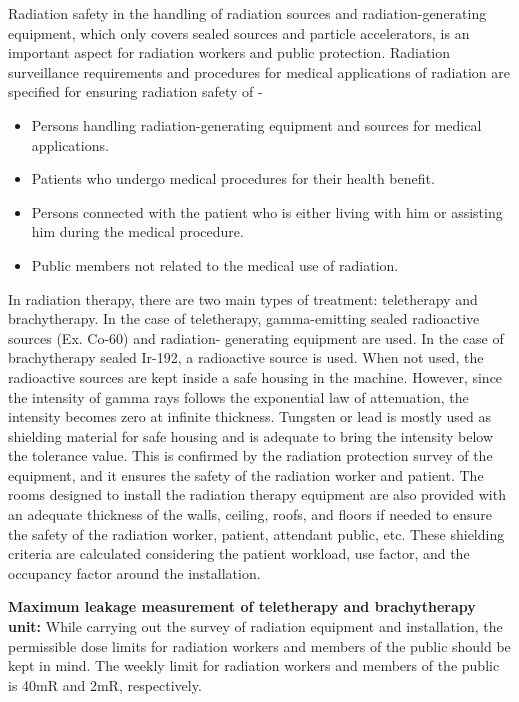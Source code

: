 Radiation safety in the handling of radiation sources and radiation-generating equipment, which
only covers sealed sources and particle accelerators, is an important aspect for radiation workers
and public protection. Radiation surveillance requirements and procedures for medical
applications of radiation are specified for ensuring radiation safety of -
\begin{itemize}
    \item Persons handling radiation-generating equipment and sources for medical applications.
    \item Patients who undergo medical procedures for their health benefit.
    \item Persons connected with the patient who is either living with him or assisting him during the medical procedure.
    \item Public members not related to the medical use of radiation.
\end{itemize}
In radiation therapy, there are two main types of treatment: teletherapy and brachytherapy. In the
case of teletherapy, gamma-emitting sealed radioactive sources (Ex. Co-60) and radiation-
generating equipment are used. In the case of brachytherapy sealed Ir-192, a radioactive source is
used. When not used, the radioactive sources are kept inside a safe housing in the machine.
However, since the intensity of gamma rays follows the exponential law of attenuation, the
intensity becomes zero at infinite thickness. Tungsten or lead is mostly used as shielding material
for safe housing and is adequate to bring the intensity below the tolerance value. This is confirmed
by the radiation protection survey of the equipment, and it ensures the safety of the radiation
worker and patient. The rooms designed to install the radiation therapy equipment are also
provided with an adequate thickness of the walls, ceiling, roofs, and floors if needed to ensure the
safety of the radiation worker, patient, attendant public, etc. These shielding criteria are calculated
considering the patient workload, use factor, and the occupancy factor around the installation.


\textbf{Maximum leakage measurement of teletherapy and brachytherapy unit: }While
carrying out the survey of radiation equipment and installation, the permissible dose limits for
radiation workers and members of the public should be kept in mind. The weekly limit for radiation
workers and members of the public is 40mR and 2mR, respectively.
